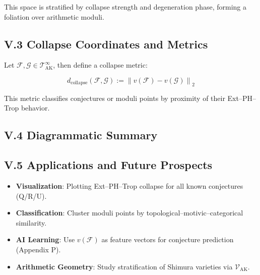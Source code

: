 \documentclass[11pt]{article}
\begin{document}
This space is stratified by collapse strength and degeneration phase, forming a foliation over arithmetic moduli.

\subsection*{V.3 Collapse Coordinates and Metrics}

Let \( \mathcal{F}, \mathcal{G} \in \mathscr{T}_{\mathrm{AK}}^{\infty} \), then define a collapse metric:

\[
d_{\mathrm{collapse}}(\mathcal{F}, \mathcal{G}) := 
\left\| v(\mathcal{F}) - v(\mathcal{G}) \right\|_2
\]

This metric classifies conjectures or moduli points by proximity of their Ext–PH–Trop behavior.

\subsection*{V.4 Diagrammatic Summary}

\vspace{1em}
\begin{center}
\end{center}
\vspace{1em}

\subsection*{V.5 Applications and Future Prospects}

\begin{itemize}
  \item \textbf{Visualization}: Plotting Ext–PH–Trop collapse for all known conjectures (Q/R/U).
  \item \textbf{Classification}: Cluster moduli points by topological–motivic–categorical similarity.
  \item \textbf{AI Learning}: Use \( v(\mathcal{F}) \) as feature vectors for conjecture prediction (Appendix P).
  \item \textbf{Arithmetic Geometry}: Study stratification of Shimura varieties via \( \mathscr{V}_{\mathrm{AK}} \).
\end{itemize}
\end{document}
